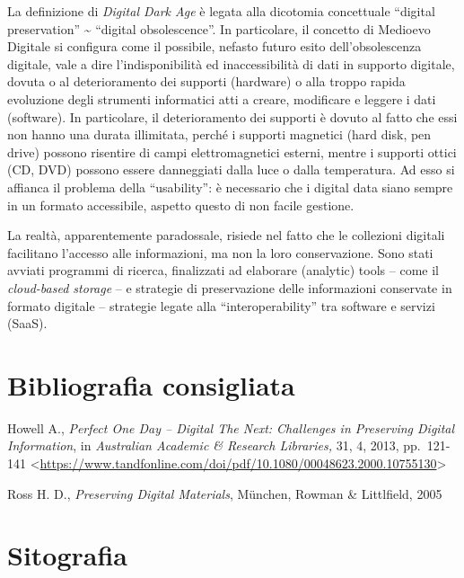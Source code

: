 \documentclass[
  b5paper,
  twoside,
  11pt,
  chapterprefix=false,
  bibliography=totocnumbered,
  listof=flat]{scrbook}
\begin{document}
La definizione di \emph{Digital Dark Age} è legata alla dicotomia concettuale
\enquote{digital preservation} \textasciitilde{} \enquote{digital obsolescence}. In particolare, il
concetto di Medioevo Digitale si configura come il possibile, nefasto
futuro esito dell'obsolescenza digitale, vale a dire l'indisponibilità
ed inaccessibilità di dati in supporto digitale, dovuta o al
deterioramento dei supporti (hardware) o alla troppo rapida evoluzione
degli strumenti informatici atti a creare, modificare e leggere i dati
(software). In particolare, il deterioramento dei supporti è dovuto al
fatto che essi non hanno una durata illimitata, perché i supporti
magnetici (hard disk, pen drive) possono risentire di campi
elettromagnetici esterni, mentre i supporti ottici (CD, DVD) possono
essere danneggiati dalla luce o dalla temperatura. Ad esso si affianca
il problema della \enquote{usability}: è necessario che i digital data siano
sempre in un formato accessibile, aspetto questo di non facile gestione.

La realtà, apparentemente paradossale, risiede nel fatto che le
collezioni digitali facilitano l'accesso alle informazioni, ma non la
loro conservazione. Sono stati avviati programmi di ricerca, finalizzati
ad elaborare (analytic) tools -- come il \emph{cloud-based storage} -- e
strategie di preservazione delle informazioni conservate in formato
digitale -- strategie legate alla \enquote{interoperability} tra software e
servizi (SaaS).

\hypertarget{bibliografia-consigliata-6}{%
\section*{Bibliografia consigliata}\label{bibliografia-consigliata-6}}

Howell A., \emph{Perfect One Day -- Digital The Next: Challenges in
Preserving Digital Information}, in \emph{Australian Academic \& Research
Libraries,} 31, 4, 2013, pp.~121-141
\textless{}\href{https://www.tandfonline.com/doi/pdf/10.1080/00048623.2000.10755130}{{https://www.tandfonline.com/doi/pdf/10.1080/00048623.2000.10755130}}\textgreater{}

Ross H. D., \emph{Preserving Digital Materials}, München, Rowman \&
Littlfield, 2005

\hypertarget{sitografia-8}{%
\section*{Sitografia}\label{sitografia-8}}
\end{document}
